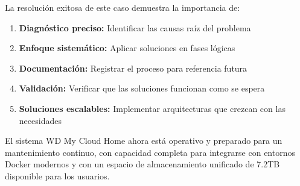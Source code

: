 \documentclass[12pt, a4paper]{article}
\begin{document}
La resolución exitosa de este caso demuestra la importancia de:

\begin{enumerate}
    \item \textbf{Diagnóstico preciso:} Identificar las causas raíz del problema
    \item \textbf{Enfoque sistemático:} Aplicar soluciones en fases lógicas
    \item \textbf{Documentación:} Registrar el proceso para referencia futura
    \item \textbf{Validación:} Verificar que las soluciones funcionan como se espera
    \item \textbf{Soluciones escalables:} Implementar arquitecturas que crezcan con las necesidades
\end{enumerate}

El sistema WD My Cloud Home ahora está operativo y preparado para un mantenimiento continuo, con capacidad completa para integrarse con entornos Docker modernos y con un espacio de almacenamiento unificado de 7.2TB disponible para los usuarios.
\end{document}
